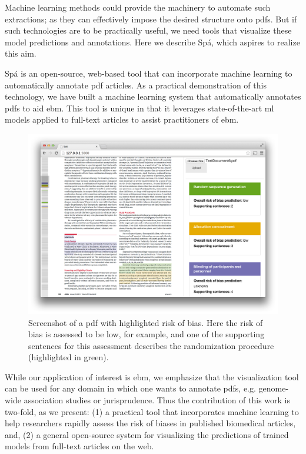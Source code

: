 \documentclass{llncs}
\begin{document}
Machine learning methods could provide the machinery to automate such extractions; as they can effectively impose the desired structure onto \acp{pdf}.
But if such technologies are to be practically useful, we need tools that visualize these model predictions and annotations.
Here we describe Spá, which aspires to realize this aim.

Spá is an open-source, web-based tool that can incorporate machine learning to automatically annotate \ac{pdf} articles.
As a practical demonstration of this technology, we have built a machine learning system that automatically annotates \acp{pdf} to aid \ac{ebm}.
This tool is unique in that it leverages state-of-the-art \ac{ml} models applied to full-text articles to assist practitioners of \ac{ebm}.

\begin{figure}[htb]
\vspace{-1em}
\centering
\includegraphics[width=1.0\linewidth]{./images/screenshot2.png}
\vspace{-1em}
\caption{\label{fig:screenshot}Screenshot of a \ac{pdf} with highlighted risk of bias. Here the risk of bias is assessed to be low, for example, and one of the supporting sentences for this assessment describes the randomization procedure (highlighted in green).}
\vspace{-1.5em}
\end{figure}

While our application of interest is \ac{ebm}, we emphasize that the visualization tool can be used for any domain in which one wants to annotate \acp{pdf}, e.g. genome-wide association studies or jurisprudence.
Thus the contribution of this work is two-fold, as we present:
(1) a practical tool that incorporates machine learning to help researchers rapidly assess the risk of biases in published biomedical articles, and,
(2) a general open-source system for visualizing the predictions of trained models from full-text articles on the web.
\end{document}
